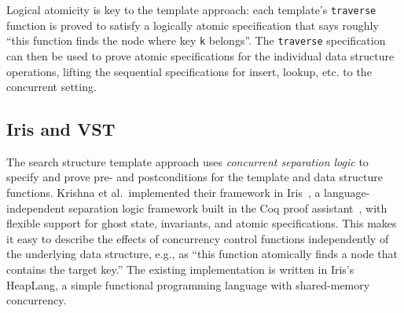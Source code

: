 \documentclass[a4paper,UKenglish,cleveref, autoref, thm-restate]{lipics-v2021}
\begin{document}

Logical atomicity is key to the template approach: each template's \lstinline{traverse} function is proved to satisfy a logically atomic specification that says roughly ``this function finds the node where key \lstinline{k} belongs''. The \lstinline{traverse} specification can then be used to prove atomic specifications for the individual data structure operations, lifting the sequential specifications for insert, lookup, etc. to the concurrent setting.

\subsection{Iris and VST}
The search structure template approach uses \emph{concurrent separation logic} to specify and prove pre- and postconditions for the template and data structure functions. Krishna et al.~implemented their framework in Iris~\cite{iris}, a language-independent separation logic framework built in the Coq proof assistant~\cite{coq}, with flexible support for ghost state, invariants, and atomic specifications. This makes it easy to describe the effects of concurrency control functions independently of the underlying data structure, e.g., as ``this function atomically finds a node that contains the target key.'' %
The existing implementation is written in Iris's HeapLang, a simple functional programming language with shared-memory concurrency.
\end{document}
